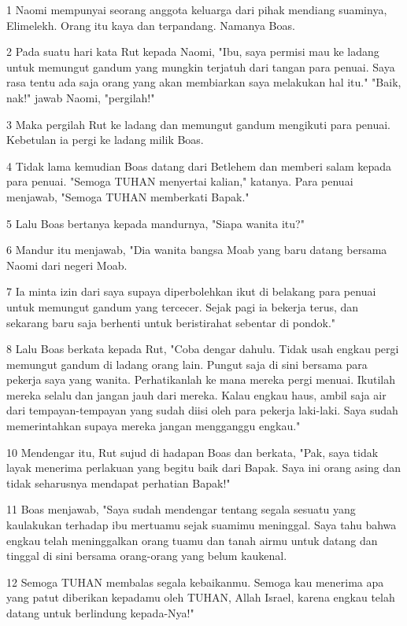 \par 1 Naomi mempunyai seorang anggota keluarga dari pihak mendiang suaminya, Elimelekh. Orang itu kaya dan terpandang. Namanya Boas.
\par 2 Pada suatu hari kata Rut kepada Naomi, "Ibu, saya permisi mau ke ladang untuk memungut gandum yang mungkin terjatuh dari tangan para penuai. Saya rasa tentu ada saja orang yang akan membiarkan saya melakukan hal itu." "Baik, nak!" jawab Naomi, "pergilah!"
\par 3 Maka pergilah Rut ke ladang dan memungut gandum mengikuti para penuai. Kebetulan ia pergi ke ladang milik Boas.
\par 4 Tidak lama kemudian Boas datang dari Betlehem dan memberi salam kepada para penuai. "Semoga TUHAN menyertai kalian," katanya. Para penuai menjawab, "Semoga TUHAN memberkati Bapak."
\par 5 Lalu Boas bertanya kepada mandurnya, "Siapa wanita itu?"
\par 6 Mandur itu menjawab, "Dia wanita bangsa Moab yang baru datang bersama Naomi dari negeri Moab.
\par 7 Ia minta izin dari saya supaya diperbolehkan ikut di belakang para penuai untuk memungut gandum yang tercecer. Sejak pagi ia bekerja terus, dan sekarang baru saja berhenti untuk beristirahat sebentar di pondok."
\par 8 Lalu Boas berkata kepada Rut, "Coba dengar dahulu. Tidak usah engkau pergi memungut gandum di ladang orang lain. Pungut saja di sini bersama para pekerja saya yang wanita. Perhatikanlah ke mana mereka pergi menuai. Ikutilah mereka selalu dan jangan jauh dari mereka. Kalau engkau haus, ambil saja air dari tempayan-tempayan yang sudah diisi oleh para pekerja laki-laki. Saya sudah memerintahkan supaya mereka jangan mengganggu engkau."
\par 10 Mendengar itu, Rut sujud di hadapan Boas dan berkata, "Pak, saya tidak layak menerima perlakuan yang begitu baik dari Bapak. Saya ini orang asing dan tidak seharusnya mendapat perhatian Bapak!"
\par 11 Boas menjawab, "Saya sudah mendengar tentang segala sesuatu yang kaulakukan terhadap ibu mertuamu sejak suamimu meninggal. Saya tahu bahwa engkau telah meninggalkan orang tuamu dan tanah airmu untuk datang dan tinggal di sini bersama orang-orang yang belum kaukenal.
\par 12 Semoga TUHAN membalas segala kebaikanmu. Semoga kau menerima apa yang patut diberikan kepadamu oleh TUHAN, Allah Israel, karena engkau telah datang untuk berlindung kepada-Nya!"
